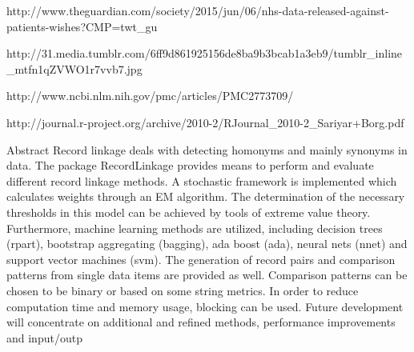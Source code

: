 http://www.theguardian.com/society/2015/jun/06/nhs-data-released-against-patients-wishes?CMP=twt_gu

http://31.media.tumblr.com/6ff9d861925156de8ba9b3bcab1a3eb9/tumblr_inline_mtfn1qZVWO1r7vvb7.jpg

http://www.ncbi.nlm.nih.gov/pmc/articles/PMC2773709/


http://journal.r-project.org/archive/2010-2/RJournal_2010-2_Sariyar+Borg.pdf

Abstract Record linkage deals with detecting
homonyms and mainly synonyms in data. The
package RecordLinkage provides means to perform and evaluate different record linkage methods.
A stochastic framework is implemented which calculates weights through an EM algorithm.
The determination of the necessary thresholds in this model can be achieved by tools
of extreme value theory. Furthermore, machine
learning methods are utilized, including decision
trees (rpart), bootstrap aggregating (bagging),
ada boost (ada), neural nets (nnet) and
support vector machines (svm). The generation
of record pairs and comparison patterns from
single data items are provided as well. Comparison
patterns can be chosen to be binary or
based on some string metrics. In order to reduce
computation time and memory usage, blocking
can be used. Future development will concentrate
on additional and refined methods, performance
improvements and input/outp
